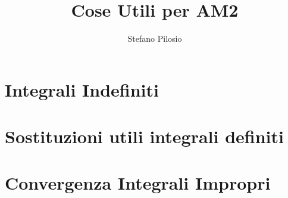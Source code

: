 \documentclass[a4paper]{article}
\theoremstyle{plain}
\begin{document}
\author{Stefano Pilosio}
\title {Cose Utili per AM2}
\maketitle

\section{Integrali Indefiniti}

\section{Sostituzioni utili integrali definiti}

\section{Convergenza Integrali Impropri}
\end{document}
